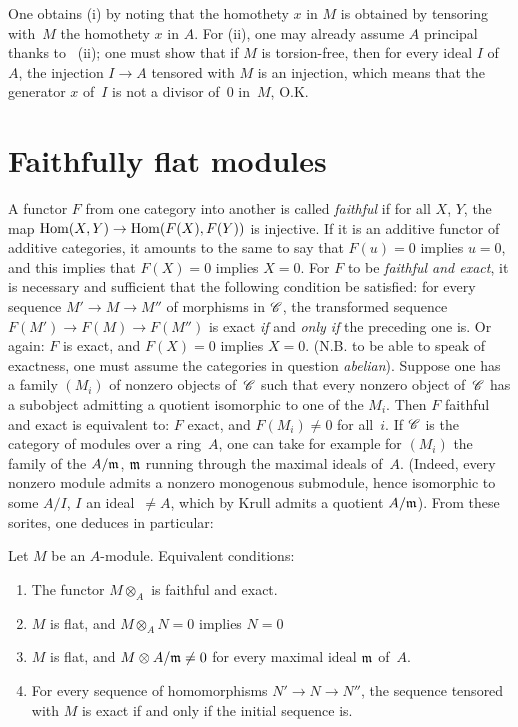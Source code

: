 One obtains (i) by noting that the homothety $x$ in $M$ is obtained by
tensoring with~$M$ the homothety $x$ in $A$. For (ii), one may already
assume $A$ principal thanks to~ (ii); one must show that
if $M$ is torsion-free, then for every ideal $I$ of~$A$, the injection
$I \to A$ tensored with $M$ is an injection, which means that the
generator $x$ of~$I$ is not a divisor of~$0$ in~$M$, O.K.

\section{Faithfully flat modules}
\label{IV.2}

A functor $F$ from one category into another is called
\emph{faithful} if for all $X$, $Y$, the map $\Hom (X,Y) \to \Hom
(F(X),F(Y))$ is injective. If it is an additive functor of additive
categories, it amounts to the same to say that $F(u)=0$ implies
$u=0$, and this implies that $F(X)=0$ implies $X=0$. For $F$ to be
\emph{faithful and exact}, it is necessary and sufficient that the
following condition be satisfied: for every sequence $M' \to M \to
M''$ of morphisms in $\cal{C}$, the transformed sequence
$F(M') \to F(M) \to F(M'')$
is exact \emph{if} and \emph{only if} the preceding one is. Or again:
$F$ is exact, and $F(X)=0$ implies $X=0$. (N.B. to be able to speak
of exactness, one must assume the categories in question
\emph{abelian}). Suppose one has a family $(M_{i})$ of nonzero objects
of~$\cal{C}$ such that every nonzero object of~$\cal{C}$ has a
subobject admitting a quotient isomorphic to one of the $M_{i}$. Then
$F$ faithful and exact is equivalent to: $F$ exact, and $F(M_{i}) \neq
0$ for all~$i$. If $\cal{C}$ is the category of modules over a
ring~$A$, one can take for example for $(M_{i})$ the family of the
$A/\mathfrak{m}$, $\mathfrak{m}$ running through the maximal ideals of~$A$.
(Indeed, every nonzero module admits a nonzero monogenous submodule,
hence isomorphic to some $A/I$, $I$ an ideal~$\neq A$, which by Krull
admits a quotient $A/\mathfrak{m}$). From these sorites, one deduces in
particular:

\begin{proposition}
\label{IV.2.1}
Let $M$ be an $A$-module. Equivalent conditions:
\begin{enumerate}
\item[(i)] The functor $M \otimes_{A}$ is faithful and exact.
\item[(i~bis)]
$M$ is flat, and $M \otimes_{A} N=0$ implies $N=0$
\item[(i~ter)] $M$ is flat, and $M \otimes A/\mathfrak{m} \neq 0$ for
every maximal ideal $\mathfrak{m}$ of~$A$.
\item[(ii)] For every sequence of homomorphisms $N' \to N \to N''$,
the sequence tensored with $M$ is exact if and only if the initial
sequence is.
\end{enumerate}
\end{proposition}

